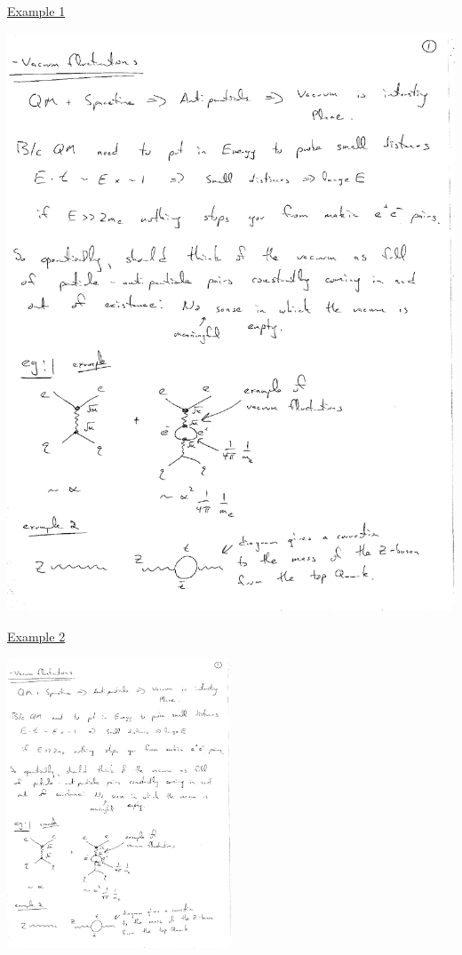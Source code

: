 {\underline{Example 1}

\bc
\includegraphics[width=\textwidth]{./VacuumFluctionations.pdf}
\ec


\underline{Example 2}

\bc
\includegraphics[width=0.5\textwidth]{./ZVacuumFluctionations.pdf}
\ec

}
